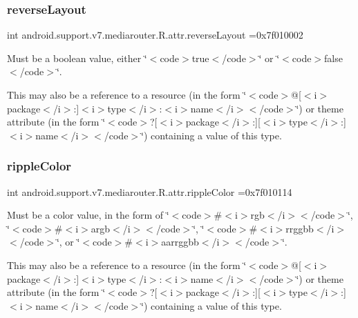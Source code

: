 \subsubsection{\texorpdfstring{reverse\+Layout}{reverseLayout}}
{\footnotesize\ttfamily int android.\+support.\+v7.\+mediarouter.\+R.\+attr.\+reverse\+Layout =0x7f010002\hspace{0.3cm}{\ttfamily [static]}}

Must be a boolean value, either \char`\"{}$<$code$>$true$<$/code$>$\char`\"{} or \char`\"{}$<$code$>$false$<$/code$>$\char`\"{}. 

This may also be a reference to a resource (in the form \char`\"{}$<$code$>$@\mbox{[}$<$i$>$package$<$/i$>$\+:\mbox{]}$<$i$>$type$<$/i$>$\+:$<$i$>$name$<$/i$>$$<$/code$>$\char`\"{}) or theme attribute (in the form \char`\"{}$<$code$>$?\mbox{[}$<$i$>$package$<$/i$>$\+:\mbox{]}\mbox{[}$<$i$>$type$<$/i$>$\+:\mbox{]}$<$i$>$name$<$/i$>$$<$/code$>$\char`\"{}) containing a value of this type. \mbox{\label{classandroid_1_1support_1_1v7_1_1mediarouter_1_1R_1_1attr_a59f40623f4a63402618d7afbde45845f}} 
\subsubsection{\texorpdfstring{ripple\+Color}{rippleColor}}
{\footnotesize\ttfamily int android.\+support.\+v7.\+mediarouter.\+R.\+attr.\+ripple\+Color =0x7f010114\hspace{0.3cm}{\ttfamily [static]}}

Must be a color value, in the form of \char`\"{}$<$code$>$\#$<$i$>$rgb$<$/i$>$$<$/code$>$\char`\"{}, \char`\"{}$<$code$>$\#$<$i$>$argb$<$/i$>$$<$/code$>$\char`\"{}, \char`\"{}$<$code$>$\#$<$i$>$rrggbb$<$/i$>$$<$/code$>$\char`\"{}, or \char`\"{}$<$code$>$\#$<$i$>$aarrggbb$<$/i$>$$<$/code$>$\char`\"{}. 

This may also be a reference to a resource (in the form \char`\"{}$<$code$>$@\mbox{[}$<$i$>$package$<$/i$>$\+:\mbox{]}$<$i$>$type$<$/i$>$\+:$<$i$>$name$<$/i$>$$<$/code$>$\char`\"{}) or theme attribute (in the form \char`\"{}$<$code$>$?\mbox{[}$<$i$>$package$<$/i$>$\+:\mbox{]}\mbox{[}$<$i$>$type$<$/i$>$\+:\mbox{]}$<$i$>$name$<$/i$>$$<$/code$>$\char`\"{}) containing a value of this type. \mbox{\label{classandroid_1_1support_1_1v7_1_1mediarouter_1_1R_1_1attr_a4124d3b7efb541e2235056b317ac4f4b}} 
